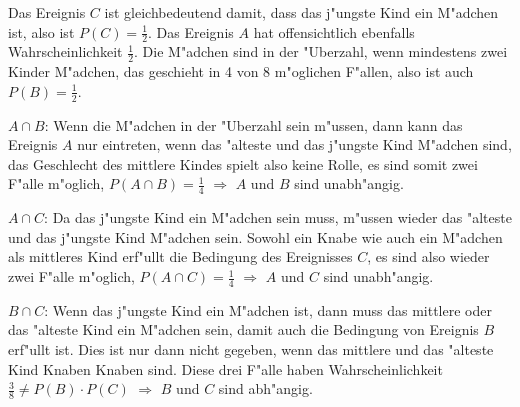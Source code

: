 \begin{loesung}
Das Ereignis $C$ ist gleichbedeutend damit, dass das j"ungste
Kind ein M"adchen ist, also ist $P(C)=\frac12$. Das Ereignis $A$ hat
offensichtlich ebenfalls Wahrscheinlichkeit $\frac12$.
Die M"adchen sind in der "Uberzahl, wenn mindestens zwei Kinder M"adchen,
das geschieht in 4 von 8 m"oglichen F"allen, also ist auch $P(B)=\frac12$.

$A\cap B$: Wenn die M"adchen in der "Uberzahl sein m"ussen, dann kann
das Ereignis $A$ nur eintreten, wenn das "alteste und das j"ungste Kind
M"adchen sind, das Geschlecht des mittlere Kindes spielt also keine
Rolle, es sind somit zwei F"alle m"oglich, $P(A\cap B)=\frac14$
$\Rightarrow$
$A$ und $B$ sind unabh"angig.

$A\cap C$: Da das j"ungste Kind ein M"adchen sein muss, m"ussen wieder
das "alteste und das j"ungste Kind M"adchen sein. Sowohl ein Knabe
wie auch ein M"adchen als mittleres Kind erf"ullt die Bedingung des
Ereignisses $C$, es sind also wieder zwei F"alle m"oglich, $P(A\cap C)=\frac14$
$\Rightarrow$
$A$ und $C$ sind unabh"angig.

$B\cap C$: Wenn das j"ungste Kind ein M"adchen ist, dann muss das mittlere
oder das "alteste Kind ein M"adchen sein, damit auch die Bedingung von
Ereignis $B$ erf"ullt ist. Dies ist nur dann nicht gegeben, wenn
das mittlere und das "alteste Kind Knaben Knaben sind. Diese drei
F"alle haben Wahrscheinlichkeit $\frac38\ne P(B)\cdot P(C)$
$\Rightarrow$
$B$ und $C$ sind abh"angig.
\end{loesung}

